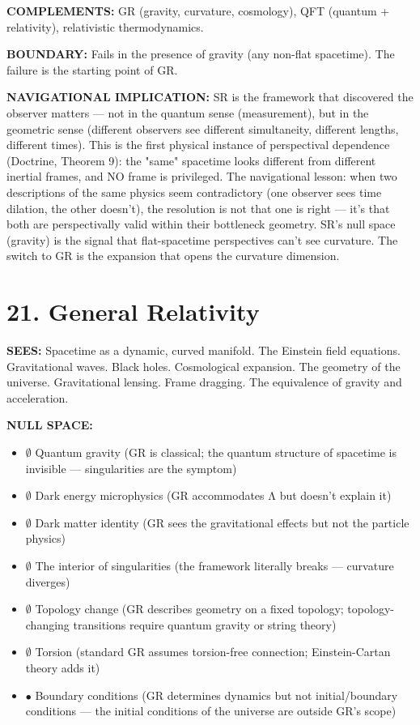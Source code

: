 \textbf{COMPLEMENTS:} GR (gravity, curvature, cosmology), QFT (quantum + relativity), relativistic thermodynamics.


\textbf{BOUNDARY:} Fails in the presence of gravity (any non-flat spacetime). The failure is the starting point of GR.


\textbf{NAVIGATIONAL IMPLICATION:} SR is the framework that discovered the observer matters — not in the quantum sense (measurement), but in the geometric sense (different observers see different simultaneity, different lengths, different times). This is the first physical instance of perspectival dependence (Doctrine, Theorem 9): the "same" spacetime looks different from different inertial frames, and NO frame is privileged. The navigational lesson: when two descriptions of the same physics seem contradictory (one observer sees time dilation, the other doesn't), the resolution is not that one is right — it's that both are perspectivally valid within their bottleneck geometry. SR's null space (gravity) is the signal that flat-spacetime perspectives can't see curvature. The switch to GR is the expansion that opens the curvature dimension.


\bigskip\noindent\makebox[\textwidth]{\color{rulegray}\rule{5cm}{0.3pt}}\bigskip


\section*{21. General Relativity}


\textbf{SEES:} Spacetime as a dynamic, curved manifold. The Einstein field equations. Gravitational waves. Black holes. Cosmological expansion. The geometry of the universe. Gravitational lensing. Frame dragging. The equivalence of gravity and acceleration.


\textbf{NULL SPACE:}

\begin{itemize}[nosep,leftmargin=*]
  \item $\emptyset$ Quantum gravity (GR is classical; the quantum structure of spacetime is invisible — singularities are the symptom)
  \item $\emptyset$ Dark energy microphysics (GR accommodates Λ but doesn't explain it)
  \item $\emptyset$ Dark matter identity (GR sees the gravitational effects but not the particle physics)
  \item $\emptyset$ The interior of singularities (the framework literally breaks — curvature diverges)
  \item $\emptyset$ Topology change (GR describes geometry on a fixed topology; topology-changing transitions require quantum gravity or string theory)
  \item $\emptyset$ Torsion (standard GR assumes torsion-free connection; Einstein-Cartan theory adds it)
  \item $\bullet$ Boundary conditions (GR determines dynamics but not initial/boundary conditions — the initial conditions of the universe are outside GR's scope)
\end{itemize}


